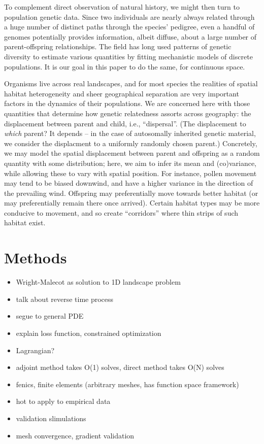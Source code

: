 \documentclass{article}
\begin{document}
To complement direct observation of natural history,
we might then turn to population genetic data.
Since two individuals are nearly always related through a huge number of distinct
paths through the species' pedigree,
even a handful of genomes potentially provides information, albeit diffuse,
about a large number of parent-offspring relationships.
The field has long used patterns of genetic diversity to estimate various quantities
by fitting mechanistic models of discrete populations.
It is our goal in this paper to do the same, for continuous space.

Organisms live across real landscapes, and for most species
the realities of spatial habitat heterogeneity and sheer geographical separation
are very important factors in the dynamics of their populations.
We are concerned here with those quantities that determine
how genetic relatedness assorts across geography:
the displacement between parent and child, i.e., ``dispersal''.
(The displacement to \emph{which} parent?
It depends -- in the case of autosomally inherited genetic material,
we consider the displacment to a uniformly randomly chosen parent.)
Concretely, we may model the spatial displacement between parent and offspring
as a random quantity with some distribution;
here, we aim to infer its mean and (co)variance,
while allowing these to vary with spatial position.
For instance, pollen movement may tend to be biased downwind,
and have a higher variance in the direction of the prevailing wind.
Offspring may preferentially move towards better habitat
(or may preferentially remain there once arrived).
Certain habitat types may be more conducive to movement,
and so create ``corridors'' where thin strips of such habitat exist.




\section{Methods}

\begin{itemize}
    \item Wright-Malecot as solution to 1D landscape problem
    \item talk about reverse time process
    \item segue to general PDE
    \item explain loss function, constrained optimization
    \item Lagrangian?
    \item adjoint method takes O(1) solves, direct method takes O(N) solves
    \item fenics, finite elements (arbitrary meshes, has function space framework)
    \item hot to apply to empirical data
    \item validation slimulations
    \item mesh convergence, gradient validation
\end{itemize}
\end{document}
